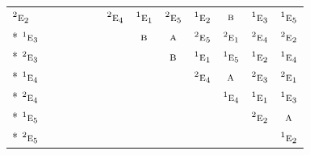 \documentclass[10pt,a4paper]{article}
\numberwithin{equation}{section}
\newcommand{\irr}[1]{\text{\normalfont\scshape #1}}
\newcommand{\conjpair}[1]{{}^{#1}}
\begin{document}
{\begin{longtable}{@{}lcccccccccccc@{}}
$\conjpair{2}\irr{e}_{2}$ &  &  &  &  &  & $\conjpair{2}\irr{e}_{4}$ & $\conjpair{1}\irr{e}_{1}$ & $\conjpair{2}\irr{e}_{5}$ & $\conjpair{1}\irr{e}_{2}$ & $\irr{b}$ & $\conjpair{1}\irr{e}_{3}$ & $\conjpair{1}\irr{e}_{5}$\\*
$\conjpair{1}\irr{e}_{3}$ &  &  &  &  &  &  & $\irr{b}$ & $\irr{a}$ & $\conjpair{2}\irr{e}_{5}$ & $\conjpair{2}\irr{e}_{1}$ & $\conjpair{2}\irr{e}_{4}$ & $\conjpair{2}\irr{e}_{2}$\\*
$\conjpair{2}\irr{e}_{3}$ &  &  &  &  &  &  &  & $\irr{b}$ & $\conjpair{1}\irr{e}_{1}$ & $\conjpair{1}\irr{e}_{5}$ & $\conjpair{1}\irr{e}_{2}$ & $\conjpair{1}\irr{e}_{4}$\\*
$\conjpair{1}\irr{e}_{4}$ &  &  &  &  &  &  &  &  & $\conjpair{2}\irr{e}_{4}$ & $\irr{a}$ & $\conjpair{2}\irr{e}_{3}$ & $\conjpair{2}\irr{e}_{1}$\\*
$\conjpair{2}\irr{e}_{4}$ &  &  &  &  &  &  &  &  &  & $\conjpair{1}\irr{e}_{4}$ & $\conjpair{1}\irr{e}_{1}$ & $\conjpair{1}\irr{e}_{3}$\\*
$\conjpair{1}\irr{e}_{5}$ &  &  &  &  &  &  &  &  &  &  & $\conjpair{2}\irr{e}_{2}$ & $\irr{a}$\\*
$\conjpair{2}\irr{e}_{5}$ &  &  &  &  &  &  &  &  &  &  &  & $\conjpair{1}\irr{e}_{2}$\\
\bottomrule\end{longtable}}
\end{document}
